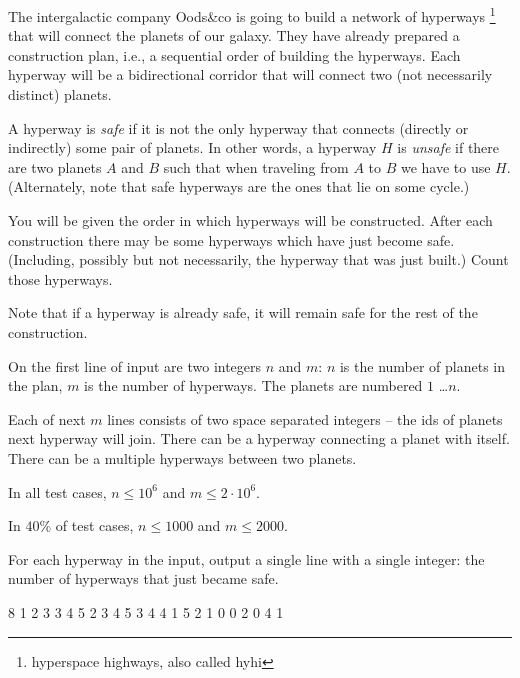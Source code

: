 

The intergalactic company Oods\&co is going to build a network of hyperways%
\footnote{hyperspace highways, also called hyhi}
that will connect the planets of our galaxy.
They have already prepared a construction plan,
i.e., a sequential order of building the hyperways.
Each hyperway will be a bidirectional corridor that will connect two (not necessarily distinct) planets.


A hyperway is \emph{safe} if it is not the only hyperway that connects (directly or indirectly)
some pair of planets. In other words, a hyperway $H$ is \emph{unsafe} if there are two planets
$A$ and $B$ such that when traveling from $A$ to $B$ we have to use $H$. (Alternately, note that safe 
hyperways are the ones that lie on some cycle.)

You will be given the order in which hyperways will be constructed.
After each construction there may be some hyperways which have just become safe.
(Including, possibly but not necessarily, the hyperway that was just built.)
Count those hyperways.

Note that if a hyperway is already safe, it will remain safe for the rest of the construction.


On the first line of input are two integers $n$ and $m$:
$n$ is the number of planets in the plan,
$m$ is the number of hyperways.
The planets are numbered $1$ \dots $n$.

Each of next $m$ lines consists
of two space separated integers --
the ids of planets next hyperway will join.
There can be a hyperway connecting a planet with itself.
There can be a multiple hyperways between two planets.

\smallskip

In all test cases, $n \leq 10^6$ and $m \leq 2\cdot10^6$.

In $40\%$ of test cases, $n \leq 1000$ and $m \leq 2000$.


For each hyperway in the input, output a single line with a single integer:
the number of hyperways that just became safe.



 8
1 2
3 3
4 5
2 3
4 5
3 4
4 1
5 2
1
0
0
2
0
4
1
\sampleEND


